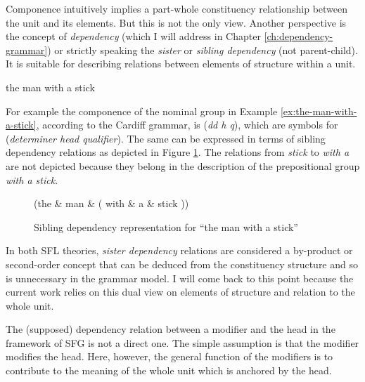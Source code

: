     Componence intuitively implies a part-whole constituency relationship between the unit and its elements. But this is not the only view. Another perspective is the concept of \textit{dependency} (which I will address in Chapter \ref{ch:dependency-grammar}) or strictly speaking the \textit{sister} or \textit{sibling dependency} (not parent-child). 
    It is suitable for describing relations between elements of structure within a unit. 
    
    \begin{exe}
        \ex\label{ex:the-man-with-a-stick} the man with a stick
    \end{exe}
    
    For example the componence of the nominal group in Example \ref{ex:the-man-with-a-stick}, according to the Cardiff grammar, is (\textit{dd h q}), which are symbols for (\textit{determiner head qualifier}). The same can be expressed in terms of sibling dependency relations as depicted in Figure \ref{fig:dep-example-man-with-a-stick}. The relations from \textit{stick} to \textit{with a} are not depicted because they belong in the description of the prepositional group \textit{with a stick}.
    
    \begin{figure}[!ht]
        \centering
        \begin{dependency}
            \begin{deptext}[column sep=1em]
                (the \& man \& ( with \& a \& stick )) \\
            \end{deptext}
        \end{dependency}
    	\caption{Sibling dependency representation for ``the man with a stick''}
        \label{fig:dep-example-man-with-a-stick}
    \end{figure}
    
    In both SFL theories, \textit{sister dependency} relations are considered a by-product or second-order concept that can be deduced from the constituency structure and so is unnecessary in the grammar model. I will come back to this point because the current work relies on this dual view on elements of structure and relation to the whole unit. 
    
    The (supposed) dependency relation between a modifier and the head in the framework of SFG is not a direct one. 
    The simple assumption is that the modifier modifies the head. Here, however, the general function of the modifiers is to contribute to the meaning of the whole unit which is anchored by the head. 
    
